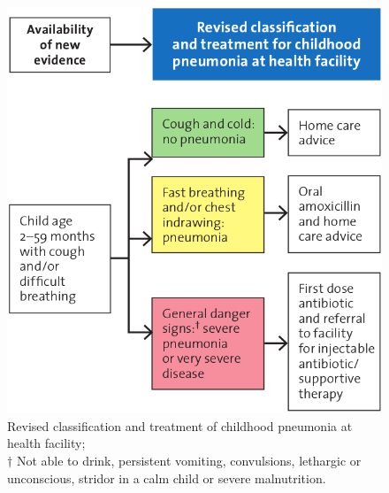 \documentclass[11pt,a4paper]{report}
\begin{document}
\begin{figure}[htp]
	\centering \includegraphics[scale=0.30]{pneumonia_WHO.png}
	\centering \caption[Childhood pneumonia]{Revised classification and treatment of childhood pneumonia at health facility;\\$\dagger$ Not able to drink, persistent vomiting, convulsions, lethargic or unconscious, stridor in a calm child or severe malnutrition. \cite{revised_who_pneumonia_2014}}
	\label{WHO-Pneumonia}
\end{figure}
\end{document}
